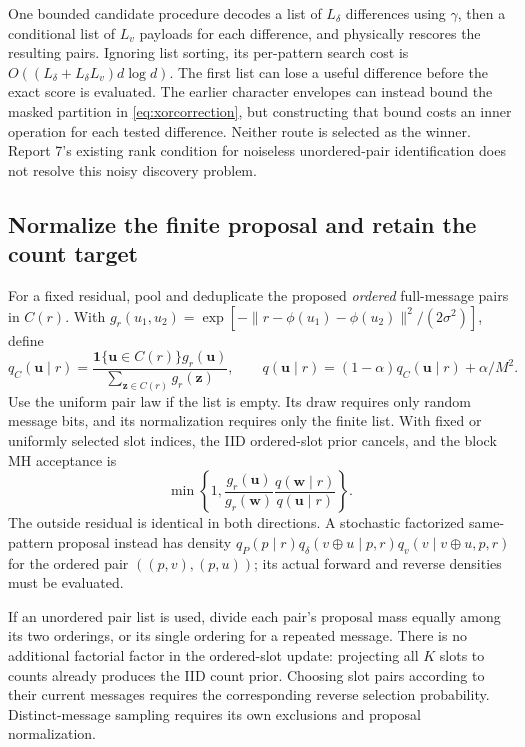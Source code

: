 \documentclass[10pt,a4paper]{article}
\newcommand{\ind}{\mathbf 1}
\begin{document}
One bounded candidate procedure decodes a list of $L_\delta$ differences using $\gamma$, then a
conditional list of $L_v$ payloads for each difference, and physically rescores the resulting pairs.
Ignoring list sorting, its per-pattern search cost is
$O((L_\delta+L_\delta L_v)d\log d)$. The first list can lose a useful difference before the exact
score is evaluated. The earlier character envelopes can instead bound the masked partition in
\eqref{eq:xorcorrection}, but constructing that bound costs an inner operation for each tested
difference. Neither route is selected as the winner. Report 7's existing rank condition for
noiseless unordered-pair identification does not resolve this noisy discovery problem.

\subsection{Normalize the finite proposal and retain the count target}
For a fixed residual, pool and deduplicate the proposed \emph{ordered} full-message pairs in $C(r)$. With
$g_r(u_1,u_2)=\exp[-\|r-\phi(u_1)-\phi(u_2)\|^2/(2\sigma^2)]$, define
\begin{equation}
 q_C(\mathbf u\mid r)=\frac{\ind\{\mathbf u\in C(r)\}g_r(\mathbf u)}
                              {\sum_{\mathbf z\in C(r)}g_r(\mathbf z)},\qquad
 q(\mathbf u\mid r)=(1-\alpha)q_C(\mathbf u\mid r)+\alpha/M^2.
 \label{eq:pairproposal}
\end{equation}
Use the uniform pair law if the list is empty. Its draw requires only random message bits, and its
normalization requires only the finite list. With fixed or uniformly selected slot indices, the IID
ordered-slot prior cancels, and the block MH acceptance is
\begin{equation}
 \min\!\left\{1,\frac{g_r(\mathbf u)}{g_r(\mathbf w)}
                  \frac{q(\mathbf w\mid r)}{q(\mathbf u\mid r)}\right\}.
 \label{eq:pairmh}
\end{equation}
The outside residual is identical in both directions. A stochastic factorized same-pattern proposal
instead has density $q_P(p\mid r)q_\delta(v\oplus u\mid p,r)q_v(v\mid v\oplus u,p,r)$ for
the ordered pair $((p,v),(p,u))$; its actual forward and reverse densities must be evaluated.

If an unordered pair list is used, divide each pair's proposal mass equally among its two orderings,
or its single ordering for a repeated message. There is no additional factorial factor in the
ordered-slot update: projecting all $K$ slots to counts already produces the IID count prior.
Choosing slot pairs according to their current messages requires the corresponding reverse selection
probability. Distinct-message sampling requires its own exclusions and proposal normalization.
\end{document}
